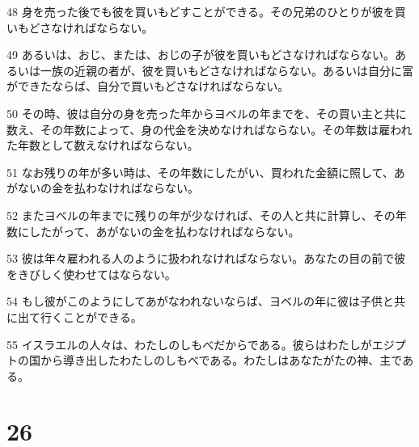 \par 48 身を売った後でも彼を買いもどすことができる。その兄弟のひとりが彼を買いもどさなければならない。
\par 49 あるいは、おじ、または、おじの子が彼を買いもどさなければならない。あるいは一族の近親の者が、彼を買いもどさなければならない。あるいは自分に富ができたならば、自分で買いもどさなければならない。
\par 50 その時、彼は自分の身を売った年からヨベルの年までを、その買い主と共に数え、その年数によって、身の代金を決めなければならない。その年数は雇われた年数として数えなければならない。
\par 51 なお残りの年が多い時は、その年数にしたがい、買われた金額に照して、あがないの金を払わなければならない。
\par 52 またヨベルの年までに残りの年が少なければ、その人と共に計算し、その年数にしたがって、あがないの金を払わなければならない。
\par 53 彼は年々雇われる人のように扱われなければならない。あなたの目の前で彼をきびしく使わせてはならない。
\par 54 もし彼がこのようにしてあがなわれないならば、ヨベルの年に彼は子供と共に出て行くことができる。
\par 55 イスラエルの人々は、わたしのしもべだからである。彼らはわたしがエジプトの国から導き出したわたしのしもべである。わたしはあなたがたの神、主である。

\chapter{26}

